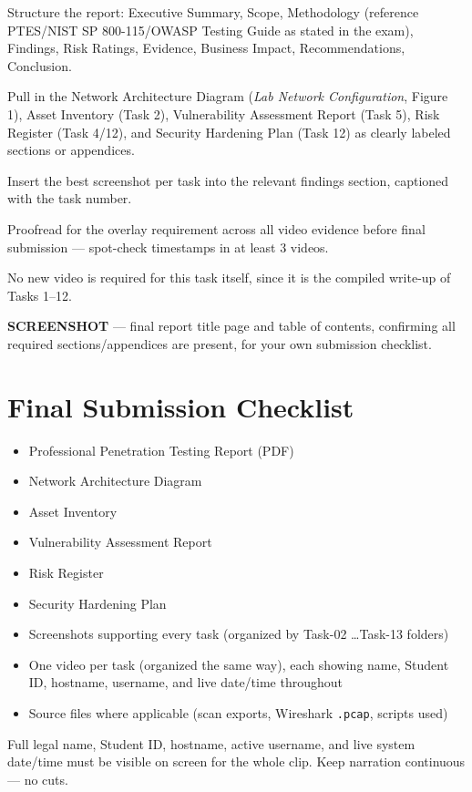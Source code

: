 \documentclass[11pt,a4paper]{article}
\begin{document}
\begin{steps}
\item Structure the report: Executive Summary, Scope, Methodology (reference
  PTES/NIST SP 800-115/OWASP Testing Guide as stated in the exam), Findings, Risk
  Ratings, Evidence, Business Impact, Recommendations, Conclusion.
\item Pull in the Network Architecture Diagram (\emph{Lab Network Configuration},
  Figure 1), Asset Inventory (Task 2), Vulnerability Assessment Report (Task 5), Risk
  Register (Task 4/12), and Security Hardening Plan (Task 12) as clearly labeled
  sections or appendices.
\item Insert the best screenshot per task into the relevant findings section, captioned
  with the task number.
\item Proofread for the overlay requirement across all video evidence before final
  submission --- spot-check timestamps in at least 3 videos.
\end{steps}

\begin{notebox}
No new video is required for this task itself, since it is the compiled write-up of
Tasks 1--12.
\end{notebox}

\begin{expectbox}
\textbf{SCREENSHOT} --- final report title page and table of contents, confirming all
required sections/appendices are present, for your own submission checklist.
\end{expectbox}

\clearpage

\section{Final Submission Checklist}

\begin{itemize}[nosep]
\item Professional Penetration Testing Report (PDF)
\item Network Architecture Diagram
\item Asset Inventory
\item Vulnerability Assessment Report
\item Risk Register
\item Security Hardening Plan
\item Screenshots supporting every task (organized by Task-02 \ldots Task-13 folders)
\item One video per task (organized the same way), each showing name, Student ID,
  hostname, username, and live date/time throughout
\item Source files where applicable (scan exports, Wireshark \texttt{.pcap}, scripts
  used)
\end{itemize}

\begin{notebox}
Full legal name, Student ID, hostname, active username, and live system date/time must
be visible on screen for the whole clip. Keep narration continuous --- no cuts.
\end{notebox}
\end{document}
